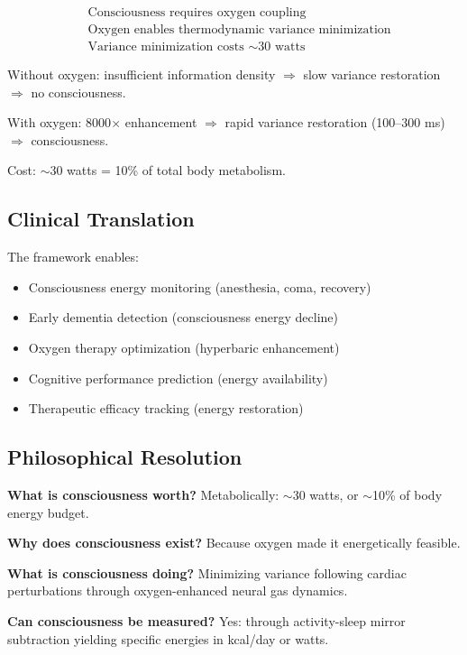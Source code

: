 \documentclass[12pt]{article}
\theoremstyle{remark}
\begin{document}
\begin{equation}
\boxed{
\begin{aligned}
&\text{Consciousness requires oxygen coupling} \\
&\text{Oxygen enables thermodynamic variance minimization} \\
&\text{Variance minimization costs } \sim\text{30 watts}
\end{aligned}
}
\end{equation}

Without oxygen: insufficient information density $\Rightarrow$ slow variance restoration $\Rightarrow$ no consciousness.

With oxygen: 8000$\times$ enhancement $\Rightarrow$ rapid variance restoration (100--300 ms) $\Rightarrow$ consciousness.

Cost: $\sim$30 watts = 10\% of total body metabolism.

\subsection{Clinical Translation}

The framework enables:
\begin{itemize}
\item Consciousness energy monitoring (anesthesia, coma, recovery)
\item Early dementia detection (consciousness energy decline)
\item Oxygen therapy optimization (hyperbaric enhancement)
\item Cognitive performance prediction (energy availability)
\item Therapeutic efficacy tracking (energy restoration)
\end{itemize}

\subsection{Philosophical Resolution}

\textbf{What is consciousness worth?} Metabolically: $\sim$30 watts, or $\sim$10\% of body energy budget.

\textbf{Why does consciousness exist?} Because oxygen made it energetically feasible.

\textbf{What is consciousness doing?} Minimizing variance following cardiac perturbations through oxygen-enhanced neural gas dynamics.

\textbf{Can consciousness be measured?} Yes: through activity-sleep mirror subtraction yielding specific energies in kcal/day or watts.
\end{document}
